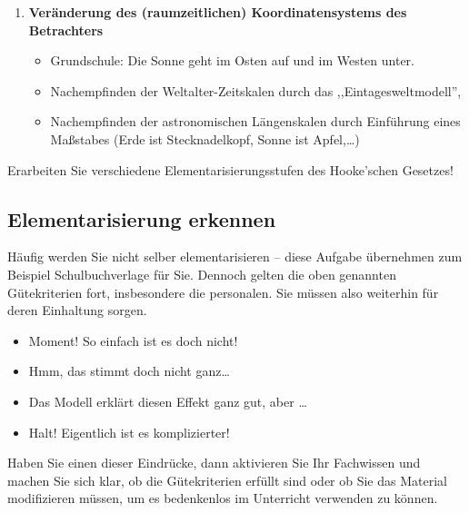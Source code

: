\begin{enumerate}
	\item \textbf{Ver\"{a}nderung des (raumzeitlichen) Koordinatensystems des
	Betrachters}
	\begin{beisp2}
	\begin{itemize}
		\item Grundschule: Die Sonne geht im Osten auf und im Westen unter.
		\item Nachempfinden der Weltalter-Zeitskalen durch das ,,Eintagesweltmodell'',
		\item Nachempfinden der astronomischen L\"{a}ngenskalen durch Einf\"{u}hrung eines
		Ma{\ss}stabes (Erde ist Stecknadelkopf, Sonne ist Apfel,\dots)
	\end{itemize}
	\end{beisp2}
	
\end{enumerate}

\begin{uea}
	Erarbeiten Sie verschiedene Elementarisierungsstufen des Hooke'schen Gesetzes!
\end{uea}

\subsection{Elementarisierung erkennen}
Häufig werden Sie nicht selber elementarisieren -- diese Aufgabe übernehmen zum Beispiel Schulbuchverlage für Sie. Dennoch gelten die oben genannten Gütekriterien fort, insbesondere die personalen. Sie müssen also weiterhin für deren Einhaltung sorgen. \begin{itemize}
	\item Moment! So einfach ist es doch nicht!
	\item Hmm, das stimmt doch nicht ganz\dots
	\item Das Modell erklärt diesen Effekt ganz gut, aber \dots
	\item Halt! Eigentlich ist es komplizierter!
\end{itemize}
Haben Sie einen dieser Eindrücke, dann aktivieren Sie Ihr Fachwissen und machen Sie sich klar, ob die Gütekriterien erfüllt sind oder ob Sie das Material modifizieren müssen, um es bedenkenlos im Unterricht verwenden zu können.

